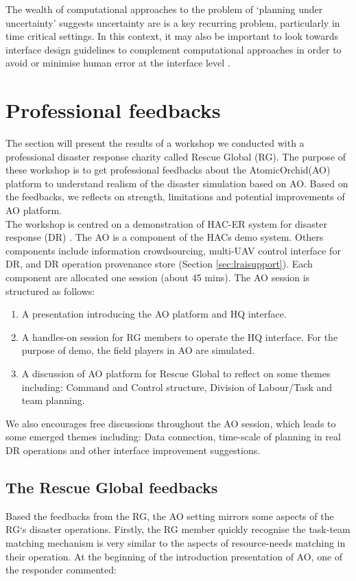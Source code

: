 The wealth of computational approaches to the problem of `planning under uncertainty' \cite{Chang2007} suggests uncertainty are is a key recurring problem, particularly in time critical settings. In this context, it may also be important to look towards interface design guidelines to complement computational approaches in order to avoid or minimise human error at the interface level \cite{Norman2013}.


\section{Professional feedbacks}\label{sec:RGworkshopone} 

The section will present the results of a workshop we conducted with a professional disaster response charity called Rescue Global (RG). The purpose of these workshop is to get professional feedbacks about the AtomicOrchid(AO) platform to understand realism of the disaster simulation based on AO. Based on the feedbacks, we reflects on strength, limitations and potential improvements of AO platform. \\

The workshop is centred on a demonstration of HAC-ER system for disaster response (DR) \cite{Ramchurn2015}. The AO is a component of the HACs demo system. Others components include information crowdsourcing, multi-UAV control interface for DR, and DR operation provenance store (Section \ref{sec:lraisupport}). Each component are allocated one session (about 45 mins). The AO session is structured as follows:\\

\begin{enumerate}
	\item A presentation introducing the AO platform and HQ interface.
	\item A handles-on session for RG members to operate the HQ interface. For the purpose of demo, the field players in AO are simulated.
	\item A discussion of AO platform for Rescue Global to reflect on some themes including: Command and Control structure, Division of Labour/Task and team planning.
\end{enumerate} 

We also encourages free discussions throughout the AO session, which leads to some emerged themes including: Data connection, time-scale of planning in real DR operations and other interface improvement suggestions.  

\subsection{The Rescue Global feedbacks}
Based the feedbacks from the RG, the AO setting  mirrors some aspects of the RG`s disaster operations. Firstly, the RG member quickly recognise the task-team matching mechanism is very similar to the aspects of resource-needs matching in their operation. At the beginning of the introduction presentation of AO, one of the responder commented: \\

